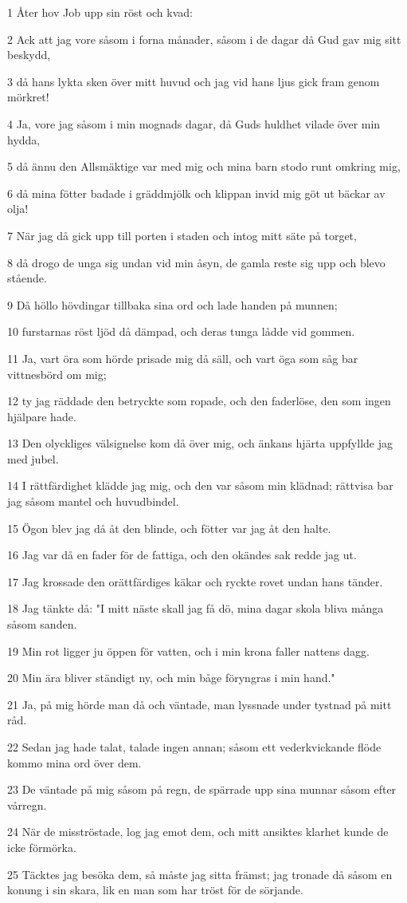 \par 1 Åter hov Job upp sin röst och kvad:
\par 2 Ack att jag vore såsom i forna månader, såsom i de dagar då Gud gav mig sitt beskydd,
\par 3 då hans lykta sken över mitt huvud och jag vid hans ljus gick fram genom mörkret!
\par 4 Ja, vore jag såsom i min mognads dagar, då Guds huldhet vilade över min hydda,
\par 5 då ännu den Allsmäktige var med mig och mina barn stodo runt omkring mig,
\par 6 då mina fötter badade i gräddmjölk och klippan invid mig göt ut bäckar av olja!
\par 7 När jag då gick upp till porten i staden och intog mitt säte på torget,
\par 8 då drogo de unga sig undan vid min åsyn, de gamla reste sig upp och blevo stående.
\par 9 Då höllo hövdingar tillbaka sina ord och lade handen på munnen;
\par 10 furstarnas röst ljöd då dämpad, och deras tunga lådde vid gommen.
\par 11 Ja, vart öra som hörde prisade mig då säll, och vart öga som såg bar vittnesbörd om mig;
\par 12 ty jag räddade den betryckte som ropade, och den faderlöse, den som ingen hjälpare hade.
\par 13 Den olyckliges välsignelse kom då över mig, och änkans hjärta uppfyllde jag med jubel.
\par 14 I rättfärdighet klädde jag mig, och den var såsom min klädnad; rättvisa bar jag såsom mantel och huvudbindel.
\par 15 Ögon blev jag då åt den blinde, och fötter var jag åt den halte.
\par 16 Jag var då en fader för de fattiga, och den okändes sak redde jag ut.
\par 17 Jag krossade den orättfärdiges käkar och ryckte rovet undan hans tänder.
\par 18 Jag tänkte då: "I mitt näste skall jag få dö, mina dagar skola bliva många såsom sanden.
\par 19 Min rot ligger ju öppen för vatten, och i min krona faller nattens dagg.
\par 20 Min ära bliver ständigt ny, och min båge föryngras i min hand."
\par 21 Ja, på mig hörde man då och väntade, man lyssnade under tystnad på mitt råd.
\par 22 Sedan jag hade talat, talade ingen annan; såsom ett vederkvickande flöde kommo mina ord över dem.
\par 23 De väntade på mig såsom på regn, de spärrade upp sina munnar såsom efter vårregn.
\par 24 När de misströstade, log jag emot dem, och mitt ansiktes klarhet kunde de icke förmörka.
\par 25 Täcktes jag besöka dem, så måste jag sitta främst; jag tronade då såsom en konung i sin skara, lik en man som har tröst för de sörjande.

